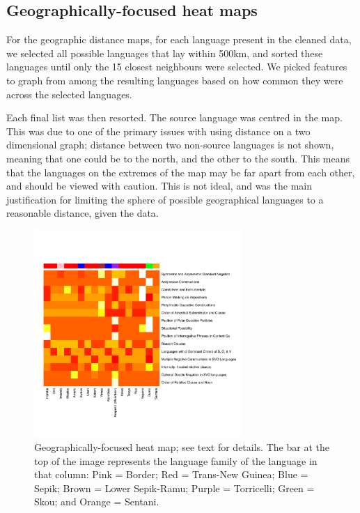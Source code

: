 \documentclass[11pt]{article}
\begin{document}
\subsection{Geographically-focused heat maps}
For the geographic distance maps, for each language present in the cleaned data, we selected all possible languages that lay within 500km, and sorted these languages until only the 15 closest neighbours were selected. We picked features to graph from among the resulting languages based on how common they were across the selected languages. 

Each final list was then resorted. The source language was centred in the map. This was due to one of the primary issues with using distance on a two dimensional graph; distance between two non-source languages is not shown, meaning that one could be to the north, and the other to the south. This means that the languages on the extremes of the map may be far apart from each other, and should be viewed with caution. %
 This is not ideal, and was the main justification for limiting the sphere of possible geographical languages to a reasonable distance, given the data.


\begin{figure}[!b]
\includegraphics[width=3.1in]
{graph2yimassmall.pdf} 
\caption{Geographically-focused heat map; see text for details. The bar at the top of the image represents the language family of the language in that column: Pink = Border; Red = Trans-New Guinea; Blue = Sepik; Brown = Lower Sepik-Ramu; Purple = Torricelli; Green = Skou; and Orange = Sentani.} 
\label{fig:heat1} 

\end{figure}
\end{document}
